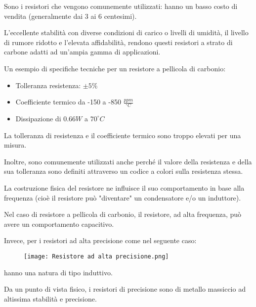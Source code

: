 Sono i resistori che vengono comunemente utilizzati: 
hanno un basso costo di vendita (generalmente dai 3 ai 6 centesimi). \newline 

L'eccellente stabilità con diverse condizioni di carico o livelli di umidità, 
il livello di rumore ridotto e l'elevata affidabilità, rendono questi resistori a strato di carbone 
adatti ad un'ampia gamma di applicazioni. \newline 

Un esempio di specifiche tecniche per  un resistore a pellicola di carbonio: 

\begin{itemize}
    \item Tolleranza resistenza: $\pm 5 \%$ 
    \item Coefficiente termico da -150 a -850 $\frac{ppm}{^{\circ} C}$ 
    \item Dissipazione di $0.66 W$ a $70 ^{\circ} C$
\end{itemize}

La tolleranza di resistenza e il coefficiente termico sono troppo elevati per una misura. \newline

Inoltre, sono comunemente utilizzati anche perché il valore della resistenza e della sua tolleranza sono definiti 
attraverso un codice a colori sulla resistenza stessa. \newline 

La costruzione fisica del resistore ne influisce il suo comportamento in base alla frequenza 
(cioè il resistore può "diventare" un condensatore e/o un induttore). \newline 

Nel caso di resistore a pellicola di carbonio, il resistore, ad alta frequenza, può avere un comportamento capacitivo. \newline 

Invece, per i resistori ad alta precisione come nel seguente caso: 

\begin{figure}[h]
    \centering
    \texttt{[image: Resistore ad alta precisione.png]}
\end{figure}

hanno una natura di tipo induttivo. \newline 

Da un punto di vista fisico, 
i resistori di precisione sono di metallo massiccio ad altissima stabilità e precisione. \newline 

